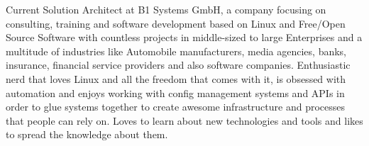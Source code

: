 

\begin{cvparagraph}

Current Solution Architect at B1 Systems GmbH, a company focusing on consulting, training and
software development based on Linux and Free/Open Source Software with countless projects in
middle-sized to large Enterprises and a multitude of industries like Automobile manufacturers, media
agencies, banks, insurance, financial service providers and also software companies. Enthusiastic
nerd that loves Linux and all the freedom that comes with it, is obsessed with automation and enjoys
working with config management systems and APIs in order to glue systems together to create awesome
infrastructure and processes that people can rely on. Loves to learn about new technologies and
tools and likes to spread the knowledge about them.
\end{cvparagraph}
